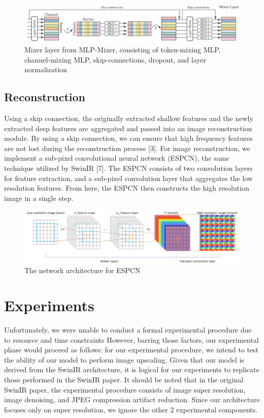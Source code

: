 \documentclass{article}
\begin{document}
\begin{figure}\label{fig:mixer}
    \centering
    \includegraphics[width=\textwidth]{mixer-layer.png}
    \caption{Mixer layer from MLP-Mixer, consisting of token-mixing MLP, channel-mixing MLP, skip-connections, dropout, and layer normalization}
\end{figure}

\subsection{Reconstruction}

Using a skip connection, the originally extracted shallow features and the newly extracted deep features are aggregated and passed into an image reconstruction module. By using a skip connection, we can ensure that high frequency features are not lost during the reconstruction process [3]. For image reconstruction, we implement a sub-pixel convolutional neural network (ESPCN), the same technique utilized by SwinIR [7]. The ESPCN consists of two convolution layers for feature extraction, and a sub-pixel convolution layer that aggregates the low resolution features. From here, the ESPCN then constructs the high resolution image in a single step.

\begin{figure}\label{fig:escpn}
    \centering
    \includegraphics[width=\textwidth]{espcn.png}
    \caption{The network architecture for ESPCN}
\end{figure}

\section{Experiments}

Unfortunately, we were unable to conduct a formal experimental procedure due to resource and time constraints However, barring those factors, our experimental phase would proceed as follows: for our experimental procedure, we intend to test the ability of our model to perform image upscaling. Given that our model is derived from the SwinIR architecture, it is logical for our experiments to replicate those performed in the SwinIR paper. It should be noted that in the original SwinIR paper, the experimental procedure consists of image super resolution, image denoising, and JPEG compression artifact reduction. Since our architecture focuses only on super resolution, we ignore the other 2 experimental components.
\end{document}
